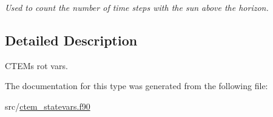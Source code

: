 \begin{DoxyCompactItemize}
\begin{DoxyCompactList}\small\item\em Used to count the number of time steps with the sun above the horizon. \end{DoxyCompactList}\end{DoxyCompactItemize}


\subsection{Detailed Description}
C\+T\+E\+M\textquotesingle{}s \textquotesingle{}rot\textquotesingle{} vars. 

The documentation for this type was generated from the following file\+:\begin{DoxyCompactItemize}
\item 
src/\hyperlink{ctem__statevars_8f90}{ctem\+\_\+statevars.\+f90}\end{DoxyCompactItemize}
